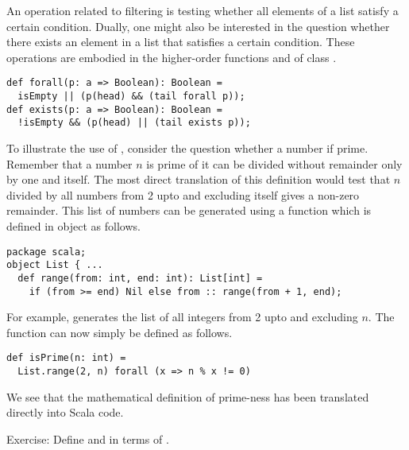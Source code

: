 \documentclass[a4paper,12pt,twoside,titlepage]{book}
\begin{document}
An operation related to filtering is testing whether all elements of a
list satisfy a certain condition. Dually, one might also be interested
in the question whether there exists an element in a list that
satisfies a certain condition. These operations are embodied in the
higher-order functions  and  of class
.
\begin{lstlisting}
def forall(p: a => Boolean): Boolean =
  isEmpty || (p(head) && (tail forall p));
def exists(p: a => Boolean): Boolean =
  !isEmpty && (p(head) || (tail exists p));
\end{lstlisting}
To illustrate the use of , consider the question whether
a number if prime. Remember that a number $n$ is prime of it can be
divided without remainder only by one and itself. The most direct
translation of this definition would test that $n$ divided by all
numbers from 2 upto and excluding itself gives a non-zero
remainder. This list of numbers can be generated using a function
 which is defined in object  as follows.
\begin{lstlisting}
package scala;
object List { ... 
  def range(from: int, end: int): List[int] = 
    if (from >= end) Nil else from :: range(from + 1, end);
\end{lstlisting}
For example, 
generates the list of all integers from 2 upto and excluding $n$.
The function  can now simply be defined as follows.
\begin{lstlisting}
def isPrime(n: int) = 
  List.range(2, n) forall (x => n % x != 0)
\end{lstlisting}
We see that the mathematical definition of prime-ness has been
translated directly into Scala code. 

Exercise: Define  and  in terms of .
\end{document}
